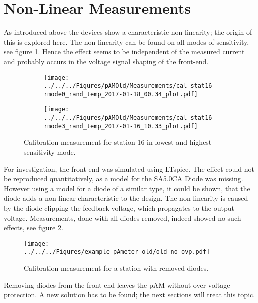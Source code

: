 \section{Non-Linear Measurements}
\label{sec:nonlinearity}
As introduced above the devices show a characteristic non-linearity; the origin of this is explored here. 
The non-linearity can be found on all modes of sensitivity, see figure \ref{fig:measurement:old:comparemodes}. Hence the effect seems to be independent of the measured current and probably occurs in the voltage signal shaping of the front-end.
\begin{figure}
	\centering
	\begin{subfigure}{\textwidth}
		\texttt{[image: ../../../Figures/pAMOld/Measurements/cal\_stat16\_rmode0\_rand\_temp\_2017-01-18\_00.34\_plot.pdf]}
	\end{subfigure}
	\begin{subfigure}{\textwidth}
	\texttt{[image: ../../../Figures/pAMOld/Measurements/cal\_stat16\_rmode3\_rand\_temp\_2017-01-16\_10.33\_plot.pdf]}
	\end{subfigure}
	\caption{Calibration measurement for station 16 in lowest and highest sensitivity mode.}
	\label{fig:measurement:old:comparemodes}
\end{figure}
For investigation, the front-end was simulated using LTspice. The effect could not be reproduced quantitatively, as a model for the SA5.0CA Diode was missing. However using a model for a diode of a similar type, it could be shown, that the diode adds a non-linear characteristic to the design. The non-linearity is caused by the diode clipping the feedback voltage, which propagates to the output voltage.
Measurements, done with all diodes removed, indeed showed no such effects, see figure \ref{fig:measurement:old:noOVP}.
\begin{figure}
	\centering
	\texttt{[image: ../../../Figures/example\_pAmeter\_old/old\_no\_ovp.pdf]}
	\caption{Calibration measurement for a station with removed diodes.}
	\label{fig:measurement:old:noOVP}
\end{figure}
Removing diodes from the front-end leaves the \ac{pAM} without over-voltage protection. A new solution has to be found; the next sections will treat this topic.
 

